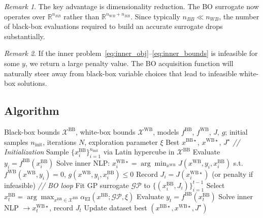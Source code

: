 \documentclass[12pt,a4paper]{article}%
\theoremstyle{plain}%
\theoremstyle{remark}%
\newtheorem{remark}{Remark}%
\theoremstyle{definition}%
\def\WB{\mathrm{WB}}
\def\BB{\mathrm{BB}}
\begin{document}
\begin{remark}
The key advantage is dimensionality reduction. The BO surrogate now operates over $\mathbb{R}^{n_{BB}}$ rather than $\mathbb{R}^{n_{WB} + n_{BB}}$. Since typically $n_{BB} \ll n_{WB}$, the number of black-box evaluations required to build an accurate surrogate drops substantially.
\end{remark}

\begin{remark}
If the inner problem~\eqref{eq:inner_obj}--\eqref{eq:inner_bounds} is infeasible for some $y$, we return a large penalty value. The BO acquisition function will naturally steer away from black-box variable choices that lead to infeasible white-box solutions.
\end{remark}

\subsection{Algorithm}\label{subsec:algorithm}

\begin{algorithm}[htbp]
\caption{Bilevel Bayesian Optimization}\label{alg:bilevel_bo}
\begin{algorithmic}[1]
\Require Black-box bounds $\mathcal{X}^{\BB}$, white-box bounds $\mathcal{X}^{\WB}$, models $f^{\BB}$, $f^{\WB}$, $J$, $g$; initial samples $n_\text{init}$, iterations $N$, exploration parameter $\xi$
\Ensure Best $x^{\BB\star}$, $x^{\WB\star}$, $J^\star$
\Statex \textit{// Initialization}
\State Sample $\{x^{\BB}_i\}_{i=1}^{n_\text{init}}$ via Latin hypercube in $\mathcal{X}^{\BB}$
    \State Evaluate $y_i = f^{\BB}(x^{\BB}_i)$
    \State Solve inner NLP: $x^{\WB\star}_i = \arg\min_{x^{\WB}} J(x^{\WB}, y_i, x^{\BB}_i)$ s.t.\ $f^{\WB}(x^{\WB}, y_i)=0$, $g(x^{\WB}, y_i, x^{\BB}_i) \leq 0$
    \State Record $J_i = J(x^{\WB\star}_i)$ (or penalty if infeasible)
\EndFor
\Statex \textit{// BO loop}
    \State Fit GP surrogate $\mathcal{GP}$ to $\{(x^{\BB}_i, J_i)\}_{i=1}^{t-1}$
    \State Select $x^{\BB}_t = \arg\max_{x^{\BB} \in \mathcal{X}^{\BB}} \alpha_\text{EI}(x^{\BB}; \mathcal{GP}, \xi)$
    \State Evaluate $y_t = f^{\BB}(x^{\BB}_t)$
    \State Solve inner NLP $\to x^{\WB\star}_t$, record $J_t$
    \State Update dataset
\EndFor
\State \Return best $(x^{\BB\star}, x^{\WB\star}, J^\star)$
\end{algorithmic}
\end{algorithm}
\end{document}
